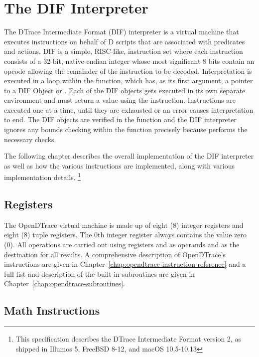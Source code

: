 \section{The DIF Interpreter}

The DTrace Intermediate Format (DIF) interpreter is a virtual machine
that executes instructions on behalf of D scripts that are associated
with predicates and actions.  DIF is a simple, RISC-like, instruction
set where each instruction consists of a 32-bit, native-endian integer
whose most significant 8 bits contain an opcode allowing the remainder
of the instruction to be decoded.  Interpretation is executed in a
loop within the  function, which has, as
its first argument, a pointer to a DIF Object or
. Each of the DIF objects gets executed in its
own separate environment and must return a value using the
 instruction. Instructions are executed one at a
time, until they are exhausted or an error causes interpretation to
end. The DIF objects are verified in the
 function and the DIF interpreter
ignores any bounds checking within the 
function precisely because  performs
the necessary checks.

The following chapter describes the overall implementation of the DIF
interpreter as well as how the various instructions are implemented,
along with various implementation details. \footnote{This
  specification describes the DTrace Intermediate Format version 2, as
  shipped in Illumos 5, FreeBSD 8-12, and macOS 10.5-10.13}

\subsection{Registers}
\label{sec:dif-registers}

The OpenDTrace virtual machine is made up of eight (8) integer registers
and eight (8) tuple registers.  The 0th integer register always
contains the value zero (0).  All operations are carried out using
registers  and  as operands and
 as the destination for all results. A comprehensive
description of OpenDTrace's instructions are given in
Chapter~\ref{chap:opendtrace-instruction-reference} and a full list
and description of the built-in subroutines are given in
Chapter~\ref{chap:opendtrace-subroutines}.

\subsection{Math Instructions}
\label{sec:dif-math}

